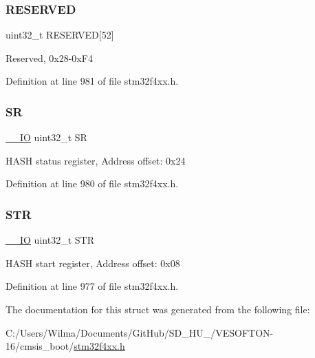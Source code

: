 \subsubsection{\texorpdfstring{R\+E\+S\+E\+R\+V\+ED}{RESERVED}}
{\footnotesize\ttfamily uint32\+\_\+t R\+E\+S\+E\+R\+V\+ED\mbox{[}52\mbox{]}}

Reserved, 0x28-\/0x\+F4 

Definition at line 981 of file stm32f4xx.\+h.

\mbox{\label{struct_h_a_s_h___type_def_af6aca2bbd40c0fb6df7c3aebe224a360}} 
\subsubsection{\texorpdfstring{SR}{SR}}
{\footnotesize\ttfamily \hyperlink{group___c_m_s_i_s__core__definitions_gaec43007d9998a0a0e01faede4133d6be}{\+\_\+\+\_\+\+IO} uint32\+\_\+t SR}

H\+A\+SH status register, Address offset\+: 0x24 

Definition at line 980 of file stm32f4xx.\+h.

\mbox{\label{struct_h_a_s_h___type_def_a7060ac1ed928ee931d7664650f2dcf75}} 
\subsubsection{\texorpdfstring{S\+TR}{STR}}
{\footnotesize\ttfamily \hyperlink{group___c_m_s_i_s__core__definitions_gaec43007d9998a0a0e01faede4133d6be}{\+\_\+\+\_\+\+IO} uint32\+\_\+t S\+TR}

H\+A\+SH start register, Address offset\+: 0x08 

Definition at line 977 of file stm32f4xx.\+h.



The documentation for this struct was generated from the following file\+:\begin{DoxyCompactItemize}
\item 
C\+:/\+Users/\+Wilma/\+Documents/\+Git\+Hub/\+S\+D\+\_\+\+H\+U\+\_/\+V\+E\+S\+O\+F\+T\+O\+N-\/16/cmsis\+\_\+boot/\hyperlink{stm32f4xx_8h}{stm32f4xx.\+h}\end{DoxyCompactItemize}
